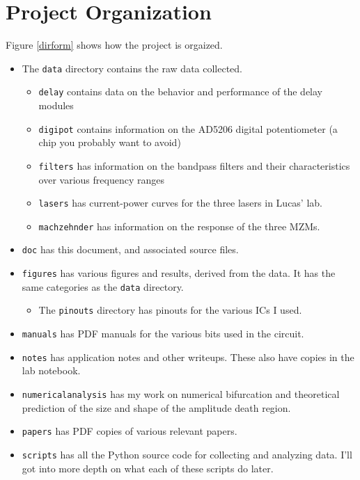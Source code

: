 \documentclass{article}
\newcommand{\code}{\texttt}
\begin{document}
    \tableofcontents
    \newpage

    \section{Project Organization}
    Figure \ref{dirform}  shows how the project is orgaized.
    \begin{itemize}
        \item The \code{data} directory contains the raw data collected.
        \begin{itemize}
            \item \code{delay} contains data on the behavior and performance of the delay modules
            \item \code{digipot} contains information on the AD5206 digital potentiometer (a chip you probably want to avoid)
            \item \code{filters} has information on the bandpass filters and their characteristics over various frequency ranges
            \item \code{lasers} has current-power curves for the three lasers in Lucas' lab. 
            \item \code{mach}\code{zehnder} has information on the response of the three MZMs.
        \end{itemize}
        \item \code{doc} has this document, and associated source files.
        \item \code{figures} has various figures and results, derived from the data. It has the same categories as the \code{data} directory.
        \begin{itemize}
            \item The \code{pinouts} directory has pinouts for the various ICs I used.
        \end{itemize}
        \item \code{manuals} has PDF manuals for the various bits used in the circuit.
        \item \code{notes} has application notes and other writeups. These also have copies in the lab notebook.
        \item \code{numericalanalysis} has my work on numerical bifurcation and theoretical prediction of the size and shape of the amplitude death region.
        \item \code{papers} has PDF copies of various relevant papers.
        \item \code{scripts} has all the Python source code for collecting and analyzing data. I'll got into more depth on what each of these scripts do later.
    \end{itemize}
    
\end{document}
